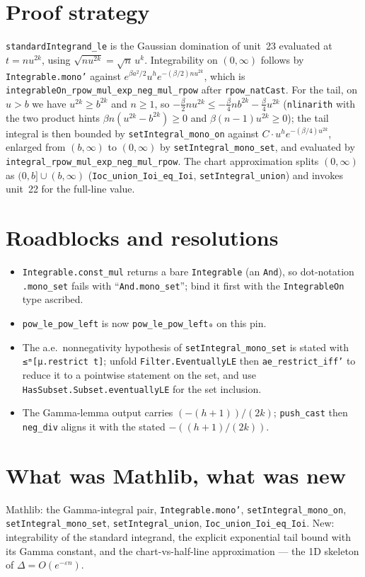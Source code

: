 \documentclass[11pt]{article}
\begin{document}
\section{Proof strategy}
\texttt{standardIntegrand\_le} is the Gaussian domination of unit~23 evaluated at $t=nu^{2k}$, using
$\sqrt{nu^{2k}}=\sqrt n\,u^k$. Integrability on $(0,\infty)$ follows by \texttt{Integrable.mono'}
against $e^{\beta a^2/2}u^h e^{-(\beta/2)nu^{2k}}$, which is
\texttt{integrableOn\_rpow\_mul\_exp\_neg\_mul\_rpow} after \texttt{rpow\_natCast}. For the tail, on
$u>b$ we have $u^{2k}\ge b^{2k}$ and $n\ge1$, so
$-\tfrac\beta2nu^{2k}\le-\tfrac\beta4nb^{2k}-\tfrac\beta4u^{2k}$ (\texttt{nlinarith} with the two
product hints $\beta n(u^{2k}-b^{2k})\ge0$ and $\beta(n-1)u^{2k}\ge0$); the tail integral is then
bounded by \texttt{setIntegral\_mono\_on} against $C\cdot u^he^{-(\beta/4)u^{2k}}$, enlarged from
$(b,\infty)$ to $(0,\infty)$ by \texttt{setIntegral\_mono\_set}, and evaluated by
\texttt{integral\_rpow\_mul\_exp\_neg\_mul\_rpow}. The chart approximation splits $(0,\infty)$ as
$(0,b]\cup(b,\infty)$ (\texttt{Ioc\_union\_Ioi\_eq\_Ioi}, \texttt{setIntegral\_union}) and invokes
unit~22 for the full-line value.

\section{Roadblocks and resolutions}
\begin{itemize}
\item \texttt{Integrable.const\_mul} returns a bare \texttt{Integrable} (an \texttt{And}), so
dot-notation \texttt{.mono\_set} fails with ``\texttt{And.mono\_set}''; bind it first with the
\texttt{IntegrableOn} type ascribed.
\item \texttt{pow\_le\_pow\_left} is now \texttt{pow\_le\_pow\_left₀} on this pin.
\item The a.e.\ nonnegativity hypothesis of \texttt{setIntegral\_mono\_set} is stated with
\texttt{≤ᵐ[μ.restrict t]}; unfold \texttt{Filter.EventuallyLE} then \texttt{ae\_restrict\_iff'} to
reduce it to a pointwise statement on the set, and use \texttt{HasSubset.Subset.eventuallyLE} for the
set inclusion.
\item The Gamma-lemma output carries $(-(h+1))/(2k)$; \texttt{push\_cast} then \texttt{neg\_div}
aligns it with the stated $-((h+1)/(2k))$.
\end{itemize}

\section{What was Mathlib, what was new}
Mathlib: the Gamma-integral pair, \texttt{Integrable.mono'}, \texttt{setIntegral\_mono\_on},
\texttt{setIntegral\_mono\_set}, \texttt{setIntegral\_union}, \texttt{Ioc\_union\_Ioi\_eq\_Ioi}.
New: integrability of the standard integrand, the explicit exponential tail bound with its Gamma
constant, and the chart-vs-half-line approximation --- the 1D skeleton of $\Delta=O(e^{-\varepsilon n})$.
\end{document}
